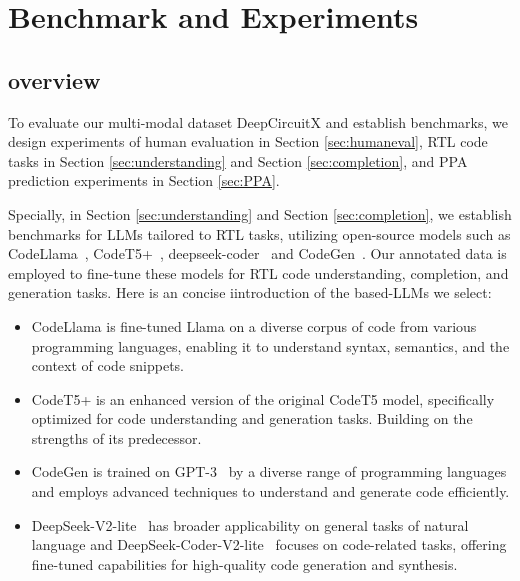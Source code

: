 \section{Benchmark and Experiments} \label{Sec:TradApp}
\subsection{overview}
To evaluate our multi-modal dataset DeepCircuitX and establish benchmarks, we design experiments of human evaluation in Section \ref{sec:humaneval}, RTL code tasks in Section \ref{sec:understanding} and Section \ref{sec:completion}, and PPA prediction experiments in Section \ref{sec:PPA}.


Specially, in Section \ref{sec:understanding} and Section \ref{sec:completion}, we establish benchmarks for LLMs tailored to RTL tasks, utilizing open-source models such as CodeLlama~\cite{codellama}, CodeT5+~\cite{codet5}, deepseek-coder~\cite{guo2024deepseekcoder} and CodeGen~\cite{codegen}. Our annotated data is employed to fine-tune these models for RTL code understanding, completion, and generation tasks. Here is an concise iintroduction of the based-LLMs we select:
\begin{itemize}
    \item CodeLlama is fine-tuned Llama on a diverse corpus of code from various programming languages, enabling it to understand syntax, semantics, and the context of code snippets. 
    \item CodeT5+ is an enhanced version of the original CodeT5 model, specifically optimized for code understanding and generation tasks. Building on the strengths of its predecessor.
    \item CodeGen is trained on GPT-3~\cite{floridi2020gpt3} by a diverse range of programming languages and employs advanced techniques to understand and generate code efficiently. 
    \item DeepSeek-V2-lite~\cite{liu2024deepseekv2} has broader applicability on general tasks of natural language and DeepSeek-Coder-V2-lite~\cite{zhu2024deepseekcoderv2} focuses on code-related tasks, offering fine-tuned capabilities for high-quality code generation and synthesis.
\end{itemize}
















